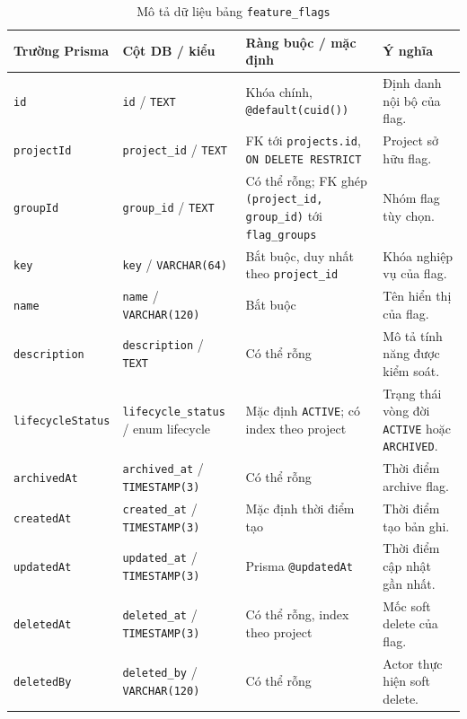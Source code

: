 \begin{table}[H]
    \centering
    \caption{Mô tả dữ liệu bảng \texttt{feature\_flags}}
    \label{tab:db-feature-flags}
    \begingroup
    \singlespacing
    \scriptsize
    \setlength{\tabcolsep}{3pt}
    \renewcommand{\arraystretch}{1.12}
    \begin{tabular}{p{} p{} p{} p{}}
        \toprule
        \textbf{Trường Prisma} & \textbf{Cột DB / kiểu} & \textbf{Ràng buộc / mặc định} & \textbf{Ý nghĩa} \\
        \midrule
        \texttt{id} & \texttt{id} / \texttt{TEXT} & Khóa chính, \texttt{@default(cuid())} & Định danh nội bộ của flag. \\
        \texttt{projectId} & \texttt{project\_id} / \texttt{TEXT} & FK tới \texttt{projects.id}, \texttt{ON DELETE RESTRICT} & Project sở hữu flag. \\
        \texttt{groupId} & \texttt{group\_id} / \texttt{TEXT} & Có thể rỗng; FK ghép \texttt{(project\_id, group\_id)} tới \texttt{flag\_groups} & Nhóm flag tùy chọn. \\
        \texttt{key} & \texttt{key} / \texttt{VARCHAR(64)} & Bắt buộc, duy nhất theo \texttt{project\_id} & Khóa nghiệp vụ của flag. \\
        \texttt{name} & \texttt{name} / \texttt{VARCHAR(120)} & Bắt buộc & Tên hiển thị của flag. \\
        \texttt{description} & \texttt{description} / \texttt{TEXT} & Có thể rỗng & Mô tả tính năng được kiểm soát. \\
        \texttt{lifecycleStatus} & \texttt{lifecycle\_status} / enum lifecycle & Mặc định \texttt{ACTIVE}; có index theo project & Trạng thái vòng đời \texttt{ACTIVE} hoặc \texttt{ARCHIVED}. \\
        \texttt{archivedAt} & \texttt{archived\_at} / \texttt{TIMESTAMP(3)} & Có thể rỗng & Thời điểm archive flag. \\
        \texttt{createdAt} & \texttt{created\_at} / \texttt{TIMESTAMP(3)} & Mặc định thời điểm tạo & Thời điểm tạo bản ghi. \\
        \texttt{updatedAt} & \texttt{updated\_at} / \texttt{TIMESTAMP(3)} & Prisma \texttt{@updatedAt} & Thời điểm cập nhật gần nhất. \\
        \texttt{deletedAt} & \texttt{deleted\_at} / \texttt{TIMESTAMP(3)} & Có thể rỗng, index theo project & Mốc soft delete của flag. \\
        \texttt{deletedBy} & \texttt{deleted\_by} / \texttt{VARCHAR(120)} & Có thể rỗng & Actor thực hiện soft delete. \\
        \bottomrule
    \end{tabular}
    \endgroup
\end{table}

